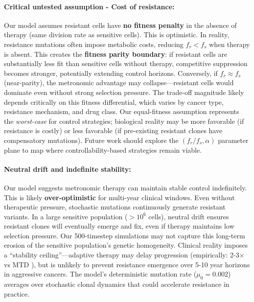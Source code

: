 \documentclass[11pt,a4paper]{article}
\begin{document}
\paragraph{Critical untested assumption - Cost of resistance:} Our model assumes resistant cells have \textbf{no fitness penalty} in the absence of therapy (same division rate as sensitive cells). This is optimistic. In reality, resistance mutations often impose metabolic costs, reducing $f_r < f_s$ when therapy is absent. This creates the \textbf{fitness parity boundary}: if resistant cells are substantially less fit than sensitive cells without therapy, competitive suppression becomes stronger, potentially extending control horizons. Conversely, if $f_r \approx f_s$ (near-parity), the metronomic advantage may collapse---resistant cells would dominate even without strong selection pressure. The trade-off magnitude likely depends critically on this fitness differential, which varies by cancer type, resistance mechanism, and drug class. Our equal-fitness assumption represents the \textit{worst-case} for control strategies; biological reality may be more favorable (if resistance is costly) or less favorable (if pre-existing resistant clones have compensatory mutations). Future work should explore the $(f_r/f_s, \alpha)$ parameter plane to map where controllability-based strategies remain viable.

\paragraph{Neutral drift and indefinite stability:} Our model suggests metronomic therapy can maintain stable control indefinitely. This is likely \textbf{over-optimistic} for multi-year clinical windows. Even without therapeutic pressure, stochastic mutations continuously generate resistant variants. In a large sensitive population ($>10^6$ cells), neutral drift ensures resistant clones will eventually emerge and fix, even if therapy maintains low selection pressure. Our 500-timestep simulations may not capture this long-term erosion of the sensitive population's genetic homogeneity. Clinical reality imposes a ``stability ceiling''---adaptive therapy may delay progression (empirically: 2-3$\times$ vs MTD \citep{zhang2017integrating}), but is unlikely to prevent resistance emergence over 5-10 year horizons in aggressive cancers. The model's deterministic mutation rate ($\mu_0 = 0.002$) averages over stochastic clonal dynamics that could accelerate resistance in practice.
\end{document}
